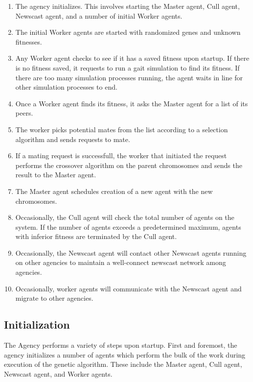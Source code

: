       \begin{enumerate}
        \item The agency initializes. This involves starting the Master agent,
          Cull agent, Newscast agent, and a number of initial Worker agents.
        \item The initial Worker agents are started with randomized genes and 
          unknown fitnesses. 
        \item Any Worker agent checks to see if it has a saved fitness upon
          startup. If there is no fitness saved, it requests to run a gait
          simulation to find its fitness. If there are too many simulation
          processes running, the agent waits in line for other simulation
          processes to end.
        \item Once a Worker agent finds its fitness, it asks the Master agent
          for a list of its peers. 
        \item The worker picks potential mates from the list according to
          a selection algorithm and sends requests to mate. 
        \item If a mating request is successfull, the worker that initiated 
          the request performs the crossover algorithm on the parent chromosomes
          and sends the result to the Master agent.
        \item The Master agent schedules creation of a new agent with the new
          chromosomes.
        \item Occasionally, the Cull agent will check the total number of
          agents on the system. If the number of agents exceeds a predetermined
          maximum, agents with inferior fitness are terminated by the Cull agent.
        \item Occasionally, the Newscast agent will contact other Newscast agents
          running on other agencies to maintain a well-connect newscast network
          among agencies.
        \item Occasionally, worker agents will communicate with the Newscast agent
          and migrate to other agencies.
      \end{enumerate}
      
    \subsection{Initialization}
      The Agency performs a variety of steps upon startup.
      First and foremost, the agency initializes a number of agents which
        perform the bulk of the work during execution of the genetic algorithm.
      These include the Master agent, Cull agent, Newscast agent, and Worker
        agents.

